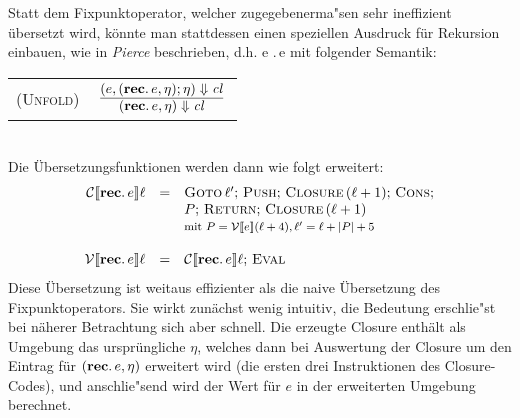 \documentclass[12pt,fleqn,a4paper]{article}
\newcommand{\RN}[1]{\mbox{\textsc{(#1)}}}
\newcommand{\cl}{\name{cl}}
\begin{document}
Statt dem Fixpunktoperator, welcher zugegebenerma"sen sehr ineffizient \"ubersetzt wird, k\"onnte man stattdessen
einen speziellen Ausdruck f\"ur Rekursion einbauen, wie in {\em Pierce} beschrieben, d.h.
\bgram
e \is \brec.\,e
\egram
mit folgender Semantik: \\[5mm]
\begin{tabular}{ll}
  \RN{Unfold} & $\regel{(e,(\brec.\,e,\eta);\eta) \Downarrow \cl}
                       {(\brec.\,e,\eta) \Downarrow \cl}$
\end{tabular} \\[3mm]
Die \"Ubersetzungsfunktionen werden dann wie folgt erweitert:
\[\begin{array}{rcl}
  \mathcal{C}\llbracket \mathbf{rec}.\,e \rrbracket\ell
  &=& \textsc{Goto}\,\ell';\,\textsc{Push};\,\textsc{Closure}\,(\ell+1);\,\textsc{Cons}; \\
  && P;\,\textsc{Return};\,\textsc{Closure}\,(\ell+1) \\
  && \footnotesize{\text{mit $P=\mathcal{V}\llbracket e \rrbracket(\ell+4), \ell'=\ell+|P|+5$}} \\
  \\
  \mathcal{V}\llbracket \mathbf{rec}.\,e \rrbracket\ell
  &=& \mathcal{C}\llbracket \mathbf{rec}.\,e \rrbracket\ell;\,\textsc{Eval}
\end{array}\]
Diese \"Ubersetzung ist weitaus effizienter als die naive \"Ubersetzung des Fixpunktoperators. Sie wirkt
zun\"achst wenig intuitiv, die Bedeutung erschlie"st bei n\"aherer Betrachtung sich aber schnell. Die
erzeugte Closure enth\"alt als Umgebung das urspr\"ungliche $\eta$, welches dann bei Auswertung der
Closure um den Eintrag f\"ur $(\mathbf{rec}.\,e,\eta)$ erweitert wird (die ersten drei Instruktionen des
Closure-Codes), und anschlie"send wird der Wert f\"ur $e$ in der erweiterten Umgebung berechnet.
\end{document}
